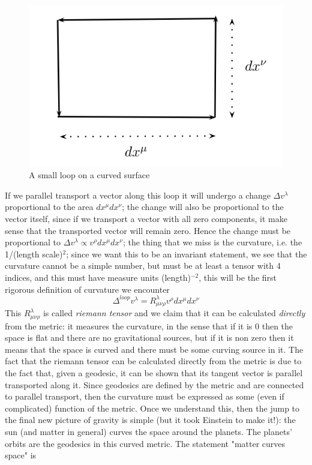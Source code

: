\documentclass[11pt, a4paper,oneside,openright]{book}
\numberwithin{equation}{section}
\begin{document}
\begin{figure}
\begin{center}
\includegraphics[scale=0.8]{Draw/loop.png}
\end{center}
\caption{A small loop on a curved surface}
\label{loop}
\end{figure}
If we parallel transport a vector along this loop it will undergo a change $\Delta v^\lambda$ proportional to the area $dx^\mu dx^\nu$; the change will also be proportional to the vector itself, since if we transport a vector with all zero components, it make sense that the transported vector will remain zero. Hence the change must be proportional to $\Delta v^\lambda\propto v^\rho dx^\mu dx^\nu$; the thing that we miss is the curvature, i.e. the 1/(length scale)$^2$; since we want this to be an invariant statement, we see that the curvature cannot be a simple number, but must be at least a tensor with 4 indices, and this must have measure units (length)$^{-2}$, this will be the first rigorous definition of curvature we encounter
\begin{equation}
\Delta^{loop}v^\lambda=R_{\mu\nu\rho}^\lambda v^\rho dx^\mu dx^\nu
\end{equation}
This $R_{\mu\nu\rho}^\lambda$ is called \textit{riemann tensor} and we claim that it can be calculated \textit{directly} from the metric: it measures the curvature, in the sense that if it is 0 then the space is flat and there are no gravitational sources, but if it is non zero then it means that the space is curved and there must be some curving source in it. The fact that the riemann tensor can be calculated directly from the metric is due to the fact that, given a geodesic, it can be shown that its tangent vector is parallel transported along it. Since geodesics are defined by the metric and are connected to parallel transport, then the curvature must be expressed as some (even if complicated) function of the metric. Once we understand this, then the jump to the final new picture of gravity is simple (but it took Einstein to make it!): the sun (and matter in general) curves the space around the planets. The planets' orbits are the geodesics in this curved metric. The statement "matter curves space" is 
\end{document}
